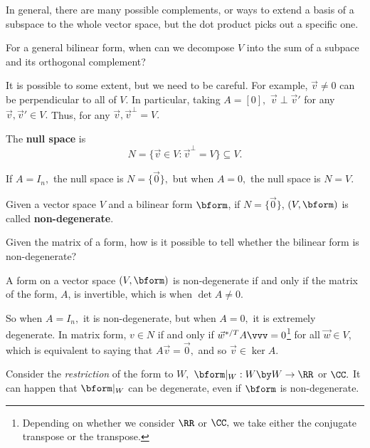 In general, there are many possible complements, or ways to extend a basis of a subspace to the whole vector space, but the dot product picks out a specific one. 

\begin{qq}
For a general bilinear form, when can we decompose $V$ into the sum of a subpace and its orthogonal complement?
\end{qq}

It is possible to some extent, but we need to be careful. For example, $\vec{v} \neq 0$ can be perpendicular to all of $V.$ In particular, taking $A = [0],$ $\vec{v} \perp \vec{v}'$ for any $\vec{v}, \vec{v}' \in V.$ Thus, for any $\vec{v}, \vec{v}^{\perp} = V.$
\begin{definition}
The \textbf{null space} is 
\[
N = \{\vec{v} \in V: \vec{v}^{\perp} = V\} \subseteq V.
\]
\end{definition}

If $A = I_n,$ the null space is $N = \{\vec{0}\},$ but when $A = 0,$ the null space is $N = V.$


\begin{definition}
Given a vector space $V$ and  a bilinear form $\bform$, if $N = \{\vec{0}\}$, $(V, \bform)$ is called \textbf{non-degenerate}.
\end{definition}

Given the matrix of a form, how is it possible to tell whether the bilinear form is non-degenerate?
\begin{proposition}
A form on a vector space $(V, \bform)$ is non-degenerate if and only if the matrix of the form, $A$, is invertible, which is when $\det A  \neq 0.$
\end{proposition}

So when $A = I_n,$ it is non-degenerate, but when $A = 0,$ it is extremely degenerate. In matrix form, $v \in N$ if and only if $\vec{w}^{*/T}A\vvv = 0$\footnote{Depending on whether we consider $\RR$ or $\CC,$ we take either the conjugate transpose or the transpose.} for all $\vec{w} \in V$, which is equivalent to saying that $A\vec{v} = \vec{0},$ and so $\vec{v} \in \ker A.$ 

Consider the \emph{restriction} of the form to $W,$ $\bform |_W: W \by W \rightarrow \RR$ or $\CC.$ It can happen that $\bform |_W$ can be degenerate, even if $\bform$ is non-degenerate. 

